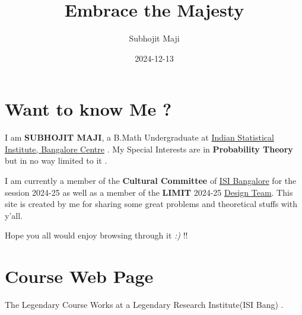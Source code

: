 \documentclass[
  letterpaper,
  DIV=11,
  numbers=noendperiod]{scrreprt}
\title{Embrace the Majesty}
\author{Subhojit Maji}
\date{2024-12-13}
\begin{document}
\maketitle



\chapter*{Want to know Me ?}\label{want-to-know-me}


I am \textbf{SUBHOJIT MAJI}, a B.Math Undergraduate at
\href{https://www.isibang.ac.in/}{Indian Statistical Institute,
Bangalore Centre} . My Special Interests are in \textbf{Probability
Theory} but in no way limited to it .

I am currently a member of the \textbf{Cultural Committee} of
\href{https://www.isibang.ac.in/}{ISI Bangalore} for the session 2024-25
as well as a member of the \textbf{LIMIT} 2024-25
\href{https://www.limitisi.in/resources/team/design}{Design Team}. This
site is created by me for sharing some great problems and theoretical
stuffs with y'all.

Hope you all would enjoy browsing through it \emph{:)} !!


\chapter*{Course Web Page}\label{course-web-page}


The Legendary Course Works at a Legendary Research Institute(ISI Bang) .

\hfill\break
\end{document}
